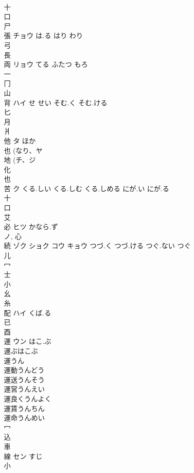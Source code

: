 \documentclass[8pt]{extreport}
\begin{document}
\begin{CJK}{UTF8}{min}
\\	十 
\\	口 
\\	尸 
\\	張	チョウ	は.る はり わり	
\\	弓 
\\	長 
\\	両	リョウ	てる ふたつ もろ	
\\	一 
\\	冂 
\\	山 
\\	背	ハイ	せ せい そむ.く そむ.ける	
\\	匕 
\\	月 
\\	爿 
\\	他	タ	ほか	
\\	也 (なり、ヤ 
\\	地 (チ、ジ 
\\	化 
\\	也 
\\	苦	ク	くる.しい くる.しむ くる.しめる にが.い にが.る	
\\	十 
\\	口 
\\	艾 
\\	必	ヒツ	かなら.ず	
\\	ノ, 心 
\\	続	ゾク ショク コウ キョウ	つづ.く つづ.ける つぐ.ない つぐ	
\\	儿 
\\	冖 
\\	士 
\\	小 
\\	幺 
\\	糸 
\\	配	ハイ	くば.る	
\\	已 
\\	酉 
\\	運	ウン	はこ.ぶ	
\\	運ぶはこぶ 
\\	運うん 
\\	運動うんどう 
\\	運送うんそう 
\\	運営うんえい 
\\	運良くうんよく 
\\	運賃うんちん 
\\	運命うんめい 
\\	冖 
\\	込 
\\	車 
\\	線	セン	すじ	
\\	小 

\end{CJK}
\end{document}
